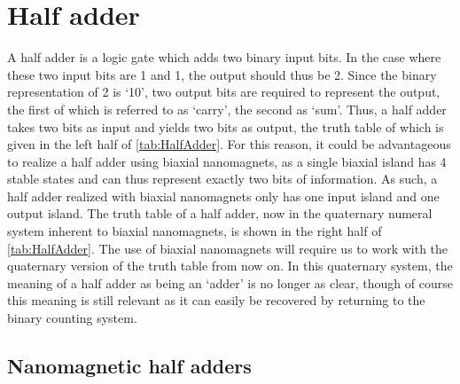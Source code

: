 \documentclass[11pt,a4paper,english]{article}
\begin{document}
\clearpage
\section{Half adder}
\label{par:halfadder}
A half adder is a logic gate which adds two binary input bits. In the case where these two input bits are 1 and 1, the output should thus be 2. Since the binary representation of 2 is `10', two output bits are required to represent the output, the first of which is referred to as `carry', the second as `sum'. Thus, a half adder takes two bits as input and yields two bits as output, the truth table of which is given in the left half of \cref{tab:HalfAdder}. For this reason, it could be advantageous to realize a half adder using biaxial nanomagnets, as a single biaxial island has 4 stable states and can thus represent exactly two bits of information. As such, a half adder realized with biaxial nanomagnets only has one input island and one output island. The truth table of a half adder, now in the quaternary numeral system inherent to biaxial nanomagnets, is shown in the right half of \cref{tab:HalfAdder}. The use of biaxial nanomagnets will require us to work with the quaternary version of the truth table from now on. In this quaternary system, the meaning of a half adder as being an `adder' is no longer as clear, though of course this meaning is still relevant as it can easily be recovered by returning to the binary counting system. \par
{}
\subsection{Nanomagnetic half adders}
\end{document}

